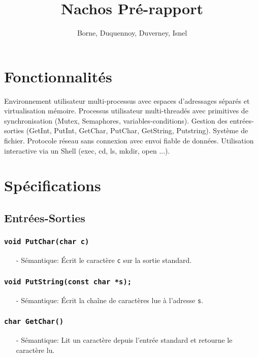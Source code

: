 \documentclass[11pt]{article}
\author{Borne, Duquennoy, Duverney, Isnel}
\date{}
\title{Nachos Pré-rapport}
\theoremstyle{definition}
\begin{document}
\maketitle



\section{Fonctionnalités}
Environnement utilisateur multi-processus avec espaces d'adressages séparés et virtualisation mémoire.
Processus utilisateur multi-threadés avec primitives de synchronisation (Mutex, Semaphores, variables-conditions). Gestion des entrées-sorties (GetInt, PutInt, GetChar, PutChar, GetString, Putstring).
Système de fichier. Protocole réseau sans connexion avec envoi fiable de données.
Utilisation interactive via un Shell (exec, cd, ls, mkdir, open ...).
\section{Spécifications}
\subsection{Entrées-Sorties}

\subsubsection{\texttt{void PutChar(char c)}}
\begin{itemize}
\item[-] Sémantique: Écrit le caractère \texttt{c} sur la sortie standard.
\end{itemize}

\subsubsection{\texttt{void PutString(const char *s);}}
\begin{itemize}
\item[-] Sémantique: Écrit la chaîne de caractères lue à l'adresse \texttt{s}.
\end{itemize}

\subsubsection{\texttt{char GetChar()}}
\begin{itemize}
\item[-] Sémantique: Lit un caractère depuis l'entrée standard et retourne le caractère lu.
\end{itemize}
\end{document}
